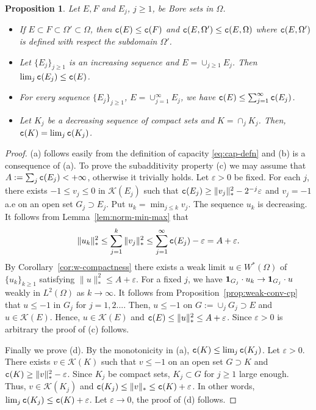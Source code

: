 \documentclass{amsart}
\newcommand{\veps}{\varepsilon}
\newcommand{\tc}{{\tt c}}
\newcommand{\Om}{\Omega}
\newcommand{\cali}[1]{\mathscr{#1}}
\newcommand{\Kc}{\cali{K}}
\newtheorem{prop}[thm]{Proposition}
\theoremstyle{definition}
\numberwithin{thm}{section}
\numberwithin{equation}{section}
\renewcommand{\[}{\begin{equation}}
\renewcommand{\]}{\end{equation}}
\begin{document}
\begin{prop}\label{prop:basic} Let $E, F$ and  $E_j$, $j\geq 1$, be Bore sets in $\Om$.
\begin{itemize}
\item
[(a)] If $E \subset F \subset \Om' \subset \Om$, then $\tc(E) \leq 
\tc(F)$ and
$\tc(E, \Om') \leq \tc (E,\Om)$ where $\tc(E,\Om')$ is  defined with respect the subdomain $\Om'$.
\item
[(b)] Let $\{E_j\}_{j\geq1} $ is an increasing sequence and $E= \cup_{j\geq 1} E_j$. Then $\lim_j \tc(E_j) \leq \tc(E)$.
\item
[(c)] For every sequence $\{E_j\}_{j\geq 1}$, $E = \cup_{j=1}^\infty E_j$, we have $\tc(E) \leq \sum_{j=1}^\infty \tc(E_j)$.
\item
[(d)] Let $K_j$ be a decreasing sequence of compact sets and $K = \cap_j K_j$. Then, $\tc(K) = \lim_j \tc(K_j)$.
\end{itemize}
\end{prop}


\begin{proof} (a) follows easily from the definition of capacity \eqref{eq:cap-defn} and (b) is a consequence of (a). To prove the subadditivity property (c) we may assume that $A:= \sum_{j} \tc (E_j)<+\infty$, otherwise it trivially holds.  Let $\veps>0$ be fixed. For each $j$, there exists $-1\leq v_j \leq 0$ in $\Kc(E_j)$ such that  $\tc (E_j) \geq \|v_j\|_*^2 -2^{-j}\veps$ and $v_j = -1$ a.e on an open set $G_j \supset E_j$. Put $u_k = \min_{j\leq k} v_j$. The sequence $u_k$ is decreasing. It follows from Lemma~\ref{lem:norm-min-max} that
$$ \|u_k\|_*^2 \leq \sum_{j=1}^k \|v_j\|_*^2 \leq \sum_{j=1}^\infty \tc (E_j) -\veps = A+\veps.$$
By Corollary~\ref{cor:w-compactness} there exists a weak limit $u\in W^*(\Om)$ of $\{u_k\}_{k\geq 1}$ satisfying $\|u\|_*^2 \leq A+\veps$. For a fixed $j$, we have  ${\bf 1}_{G_j} \cdot u_k \to {\bf 1}_{G_j} \cdot u$ weakly in $L^2(\Om)$ as $k\to \infty$.  It follows from Proposition~\ref{prop:weak-conv-cp} that $u \leq -1$ in $G_j$ for $j=1,2...$. Then, $u \leq -1$ on $G:= \cup_j G_j \supset E$ and $u \in \Kc(E)$.
Hence, $u \in \Kc(E)$ and $\tc (E)\leq \|u\|_*^2 \leq A+\veps$. Since $\veps>0$ is arbitrary the proof of (c) follows. 

Finally we prove (d). By the monotonicity in (a), $\tc(K) \leq \lim_{j} \tc(K_j)$. Let $\veps>0$. There exists $v\in \Kc(K)$ such that $v\leq -1$ on an open set $G\supset K$ and $\tc (K) \geq \|v\|_*^2 -\veps$. Since $K_j$ be compact sets, $K_j \subset G$ for $j \geq 1$ large enough. Thus, $v \in \Kc(K_j)$ and $\tc (K_j) \leq \|v\|_* \leq \tc(K) +\veps$. In other words, $\lim_j \tc (K_j) \leq \tc (K) +\veps$. Let $\veps \to 0$, the proof of (d) follows.
\end{proof}
\end{document}
